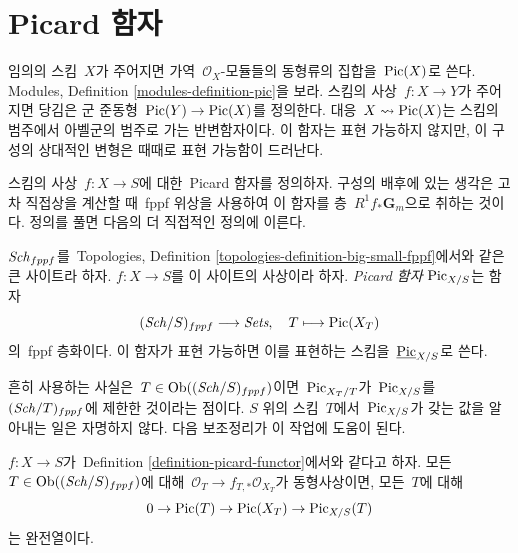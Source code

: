 \section{Picard 함자}
\label{section-picard-functor}

\noindent
임의의 스킴\  $X$가 주어지면 가역\  $\mathcal{O}_X$-모듈들의 동형류의
집합을\  $\mathop{\mathrm{Pic}}\nolimits(X)$로 쓴다. Modules, Definition
\ref{modules-definition-pic}을 보라. 스킴의 사상\  $f : X \to Y$가 주어지면
당김은 군 준동형\  $\mathop{\mathrm{Pic}}\nolimits(Y) \to \mathop{\mathrm{Pic}}\nolimits(X)$를 정의한다. 대응\ 
$X \leadsto \mathop{\mathrm{Pic}}\nolimits(X)$는 스킴의 범주에서 아벨군의 범주로 가는 반변함자이다.
이 함자는 표현 가능하지 않지만, 이 구성의 상대적인 변형은 때때로 표현
가능함이 드러난다.

\medskip\noindent
스킴의 사상\  $f : X \to S$에 대한\  Picard 함자를 정의하자. 구성의 배후에
있는 생각은 고차 직접상을 계산할 때\  fppf 위상을 사용하여 이 함자를 층\ 
$R^1f_*\mathbf{G}_m$으로 취하는 것이다. 정의를 풀면 다음의 더 직접적인
정의에 이른다.

\begin{definition}
\label{definition-picard-functor}
$\mathit{Sch}_{fppf}$를\  Topologies, Definition
\ref{topologies-definition-big-small-fppf}에서와 같은 큰 사이트라 하자.
$f : X \to S$를 이 사이트의 사상이라 하자. {\it Picard 함자}
$\mathrm{Pic}_{X/S}$는 함자
$$
(\mathit{Sch}/S)_{fppf} \longrightarrow \textit{Sets},\quad
T \longmapsto \mathop{\mathrm{Pic}}\nolimits(X_T)
$$
의\  fppf 층화이다. 이 함자가 표현 가능하면 이를 표현하는 스킴을\ 
$\underline{\mathrm{Pic}}_{X/S}$로 쓴다.
\end{definition}

\noindent
흔히 사용하는 사실은\  $T \in \mathop{\mathrm{Ob}}\nolimits((\mathit{Sch}/S)_{fppf})$이면\ 
$\mathrm{Pic}_{X_T/T}$가\  $\mathrm{Pic}_{X/S}$를\ 
$(\mathit{Sch}/T)_{fppf}$에 제한한 것이라는 점이다. $S$ 위의 스킴\  $T$에서\ 
$\mathrm{Pic}_{X/S}$가 갖는 값을 알아내는 일은 자명하지 않다.
다음 보조정리가 이 작업에 도움이 된다.

\begin{lemma}
\label{lemma-flat-geometrically-connected-fibres}
$f : X \to S$가\  Definition \ref{definition-picard-functor}에서와 같다고 하자.
모든\  $T \in \mathop{\mathrm{Ob}}\nolimits((\mathit{Sch}/S)_{fppf})$에 대해\ 
$\mathcal{O}_T \to f_{T, *}\mathcal{O}_{X_T}$가 동형사상이면, 모든\  $T$에
대해
$$
0 \to \mathop{\mathrm{Pic}}\nolimits(T) \to \mathop{\mathrm{Pic}}\nolimits(X_T) \to \mathrm{Pic}_{X/S}(T)
$$
는 완전열이다.
\end{lemma}

